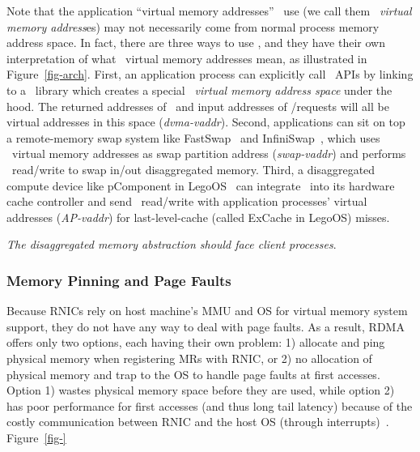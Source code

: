 Note that the application ``virtual memory addresses'' \sys\ use (we call them \textit{\sys\ virtual memory address}es) may not necessarily come from normal process memory address space.
In fact, there are three ways to use \sys, and they have their own interpretation of what \sys\ virtual memory addresses mean,
as illustrated in Figure~\ref{fig-arch}.
First, an application process can explicitly call \sys\ APIs by linking to a \sys\ library which creates a special \textit{\sys\ virtual memory address space}
under the hood. 
The returned addresses of \alloc\ and input addresses of \sysread/\syswrite requests will all be virtual addresses in this space ({\em dvma-vaddr}).
Second, applications can sit on top a remote-memory swap system like FastSwap~\cite{FastSwap} and InfiniSwap~\cite{InfiniSwap},
which uses \sys\ virtual memory addresses as swap partition address ({\em swap-vaddr}) and performs \sys\ read/write to swap in/out disaggregated memory.
Third, a disaggregated compute device like pComponent in LegoOS~\cite{Shan18-OSDI} can integrate \sys\ into its hardware cache controller
and send \sys\ read/write with application processes' virtual addresses ({\em AP-vaddr}) for last-level-cache (called ExCache in LegoOS) misses. 



\textit{The disaggregated memory abstraction should face client processes}.


\subsubsection{Memory Pinning and Page Faults}
\label{sec:pagefault}

Because RNICs rely on host machine's MMU and OS for virtual memory system support, they do not have any way to deal with page faults.
As a result, RDMA offers only two options, each having their own problem:
1) allocate and ping physical memory when registering MRs with RNIC, 
or 2) no allocation of physical memory and trap to the OS to handle page faults at first accesses.
Option 1) wastes physical memory space before they are used, 
while option 2) has poor performance for first accesses (and thus long tail latency) 
because of the costly communication between RNIC and the host OS (through interrupts)~\cite{ASPLOS17}.
Figure~\ref{fig-} 

